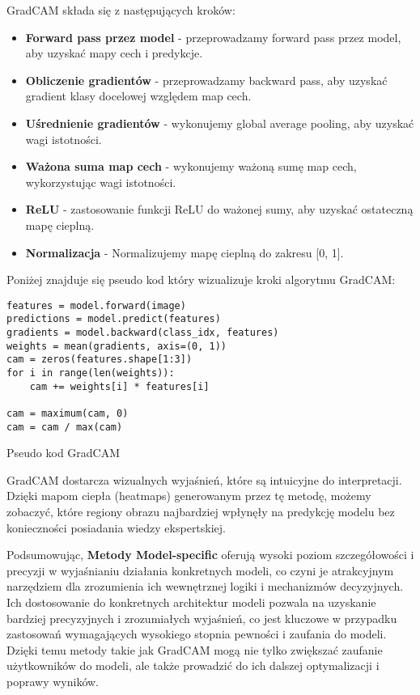 GradCAM składa się z następujących kroków:
\begin{itemize}
	\item \textbf{Forward pass przez model} - przeprowadzamy forward pass przez model, aby uzyskać mapy cech i predykcje.
	\item \textbf{Obliczenie gradientów} - przeprowadzamy backward pass, aby uzyskać gradient klasy docelowej względem map cech.
	\item \textbf{Uśrednienie gradientów} - wykonujemy global average pooling, aby uzyskać wagi istotności.
	\item \textbf{Ważona suma map cech} - wykonujemy ważoną sumę map cech, wykorzystując wagi istotności.
	\item \textbf{ReLU} - zastosowanie funkcji ReLU do ważonej sumy, aby uzyskać ostateczną mapę cieplną.
	\item \textbf{Normalizacja} - Normalizujemy mapę cieplną do zakresu [0, 1].
\end{itemize}

Poniżej znajduje się pseudo kod który wizualizuje kroki algorytmu GradCAM:

\begin{listing}
	\begin{verbatim}
features = model.forward(image)
predictions = model.predict(features)
gradients = model.backward(class_idx, features)
weights = mean(gradients, axis=(0, 1))
cam = zeros(features.shape[1:3])
for i in range(len(weights)):
    cam += weights[i] * features[i]

cam = maximum(cam, 0)
cam = cam / max(cam)
    \end{verbatim}
	\caption{Pseudo kod GradCAM} \label{listing:gradcam}
\end{listing}

GradCAM dostarcza  wizualnych wyjaśnień, które są intuicyjne do interpretacji.
Dzięki mapom ciepła (heatmaps) generowanym przez tę metodę, możemy zobaczyć, które regiony obrazu najbardziej wpłynęły na predykcję modelu bez konieczności posiadania wiedzy ekspertskiej.

\vspace{1cm}

Podsumowując, \textbf{Metody Model-specific} oferują wysoki poziom szczegółowości i precyzji w wyjaśnianiu działania konkretnych modeli, co czyni je atrakcyjnym narzędziem dla zrozumienia ich wewnętrznej logiki i mechanizmów decyzyjnych.
Ich dostosowanie do konkretnych architektur modeli pozwala na uzyskanie bardziej precyzyjnych i zrozumiałych wyjaśnień, co jest kluczowe w przypadku zastosowań wymagających wysokiego stopnia pewności i zaufania do modeli.
Dzięki temu metody takie jak GradCAM mogą nie tylko zwiększać zaufanie użytkowników do modeli, ale także prowadzić do ich dalszej optymalizacji i poprawy wyników.

